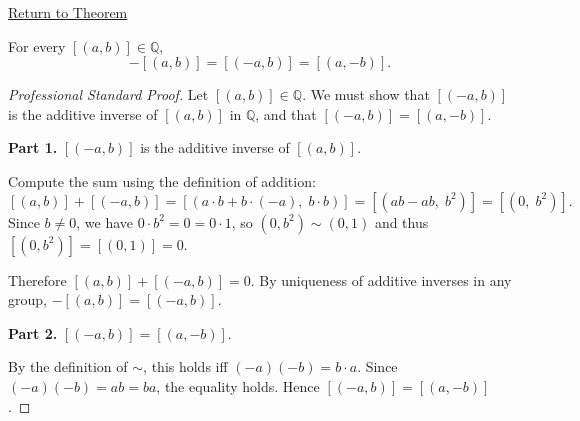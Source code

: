 \newpage
{}
\label{prf:ec-negation}

\begin{remark*}[Return]
\hyperref[thm:ec-negation]{Return to Theorem}
\end{remark*}

\begin{theorem*}
For every $[(a,b)]\in\mathbb{Q}$,
\[
-[(a,b)] = [(-a,b)] = [(a,-b)].
\]
\end{theorem*}

\begin{proof}[Professional Standard Proof]
\LRAProofBodyStart
Let $[(a,b)]\in\mathbb{Q}$. We must show that $[(-a,b)]$ is the additive
inverse of $[(a,b)]$ in $\mathbb{Q}$, and that $[(-a,b)] = [(a,-b)]$.

\textbf{Part 1.} $[(-a,b)]$ is the additive inverse of $[(a,b)]$.

Compute the sum using the definition of addition:
\[
[(a,b)] + [(-a,b)]
= [(a\cdot b + b\cdot(-a),\; b\cdot b)]
= [(ab - ab,\; b^2)]
= [(0,\; b^2)].
\]
Since $b\neq 0$, we have $0\cdot b^2 = 0 = 0\cdot 1$, so $(0,b^2)\sim(0,1)$
and thus $[(0,b^2)] = [(0,1)] = 0$.

Therefore $[(a,b)] + [(-a,b)] = 0$. By uniqueness of additive inverses in
any group, $-[(a,b)] = [(-a,b)]$.

\textbf{Part 2.} $[(-a,b)] = [(a,-b)]$.

By the definition of $\sim$, this holds iff $(-a)(-b) = b\cdot a$. Since
$(-a)(-b) = ab = ba$, the equality holds. Hence $[(-a,b)] = [(a,-b)]$.
\end{proof}

